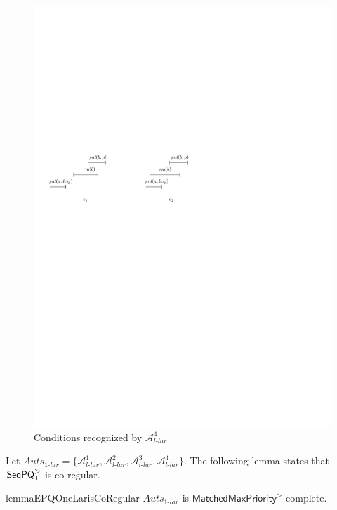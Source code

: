 \begin{figure}[htbp]
  \centering
  \includegraphics[width=0.7 \textwidth]{figures/PIC_HIS_PQ1Lar-rprp.pdf}
  \caption{Conditions recognized by $\mathcal{A}_{\textit{l-lar}}^4$}
  \label{fig:his for APQ1Lar-4}
\end{figure}

Let $\textit{Auts}_{\textit{1-lar}} = \{ \mathcal{A}_{\textit{l-lar}}^1, \mathcal{A}_{\textit{l-lar}}^2, \mathcal{A}_{\textit{l-lar}}^3, \mathcal{A}_{\textit{l-lar}}^4 \}$. The following lemma states that $\mathsf{SeqPQ}_1^{>}$ is co-regular.


\begin{restatable}{lemma}{EPQOneLarisCoRegular}
\label{lemma:EPQ1Lar is co-regular}
$\textit{Auts}_{\textit{1-lar}}$ is $\mathsf{MatchedMaxPriority}^{>}$-complete.
\end{restatable}


